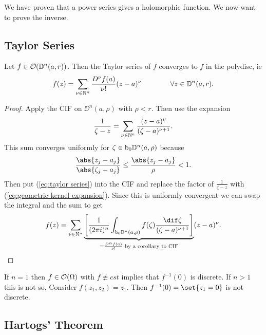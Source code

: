 We have proven that a power series gives a holomorphic function. We now want to prove the inverse.

\subsection{Taylor Series}

\begin{theorem}
    Let $f \in \mathcal{O}(\mathbb{D}^n(a,r))$. Then the Taylor series of $f$ converges to $f$ in the polydisc, ie
    \begin{align}\label{eq:taylor series}
        f(z) = \sum_{\nu \in \mathbb{N}^n} \frac{D^\nu f(a)}{\nu!} (z-a)^\nu \qquad \qquad \forall z \in \mathbb{D}^n(a,r).
    \end{align}
\end{theorem}


\begin{proof}
    Apply the CIF on $\DD^n(a,\rho)$ with $\rho < r$. Then use the expansion
    \begin{align}\label{eq:geometric kernel expansion}
        \frac{1}{\zeta - z} = \sum_{\nu \in \mathbb{N}^n} \frac{(z-a)^\nu}{(\zeta-a)^{\nu+1}}.
    \end{align}
    This sum converges uniformly for $\zeta \in \operatorname{b}\!_0 \mathbb{D}^n (a, \rho)$ because
    \begin{align*}
        \frac{\abs{z_j - a_j}}{\abs{\zeta_j - a_j}} \leq \frac{\abs{z_j - a_j}}{\rho} < 1.
    \end{align*}
    Then put (\ref{eq:taylor series}) into the CIF and replace the factor of $\frac{1}{\zeta-z}$ with (\ref{eq:geometric kernel expansion}). Since this is uniformly convergent we can swap the integral and the sum to get
    \begin{align*}
        f(z) = \sum_{\nu \in \N^n} \underbrace{\left[ \frac{1}{(2 \pi i)^n} \int_{\bdy_0 \DD^n(a,\rho)} f(\zeta) \frac{\dif \zeta }{(\zeta - a)^{\nu +1}}\right]}_{= \frac{D^\alpha f(a)}{\nu!} \text{ by a corollary to CIF}} (z-a)^\nu.
    \end{align*}
\end{proof}

\begin{remark}
    If $n=1$ then $f \in \mathcal{O}(\Omega)$ with $f \not\equiv cst$ implies that $f^{-1}(0)$ is discrete. If $n>1$ this is not so, Consider $f(z_1, z_2) = z_1$. Then $f^{-1}(0) = \set{z_1 = 0}$ is not discrete.
\end{remark}

\subsection{Hartogs' Theorem}


